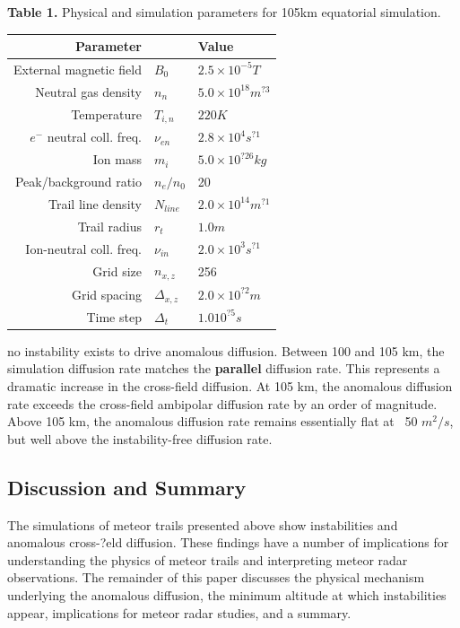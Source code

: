 \documentclass [a4paper,10pt,twocolumn]{article}
\begin{document}
\normalsize
\protect{}

\begin{flushleft}
\noindent\textbf{Table 1.}
Physical and simulation parameters for 105km equatorial simulation.
\end{flushleft}
\begin{tabular}{rll}
\hline
\textbf{Parameter} & & \textbf{Value}\\
\hline
External magnetic field & $B_0$ & $2.5\times 10^{-5} T$\\
Neutral gas density & $n_n$ & $5.0 \times 10^{18} m^{?3}$\\ Temperature & $T_{i,n}$ & $220 K$\\
$e^{-}$ neutral coll. freq. & $ \nu_{en}$ & $2.8\times 10^4 s^{?1}$\\
Ion mass & $m_i$ & $5.0\times 10^{?26} kg$\\
Peak/background ratio & $n_e/n_0$ & 20\\
Trail line density & $N_{line}$ & $2.0 \times 10^{14} m^{?1}$\\
Trail radius & $r_t$ & $1.0 m$\\
Ion-neutral coll. freq. & $\nu_{in}$ & $2.0 \times 10^3 s^{?1}$\\
Grid size & $n_{x,z}$ & 256\\
Grid spacing & $\Delta_{x,z}$ & $2.0 \times 10^{?2} m$\\
Time step & $\Delta_t$ & $1.0  10^{?5} s$\\
\hline
\end{tabular}

\noindent no instability exists to drive anomalous diffusion. Between 100 and 105 km, the simulation diffusion rate matches the \textbf{parallel} diffusion rate. This represents a dramatic increase in the cross-field diffusion. At 105 km, the anomalous diffusion rate exceeds the cross-field ambipolar diffusion rate by an order of magnitude. Above 105 km, the anomalous diffusion rate remains essentially flat at ~50 $m^2/s$, but well above the instability-free diffusion rate.
\subsection*{Discussion and Summary}
The simulations of meteor trails presented above show instabilities and anomalous cross-?eld diffusion. These findings have a number of implications for understanding the physics of meteor trails and interpreting meteor radar observations. The remainder of this paper discusses the physical mechanism underlying the anomalous diffusion, the minimum altitude at which instabilities appear, implications for meteor radar studies, and a summary.
\end{document}
